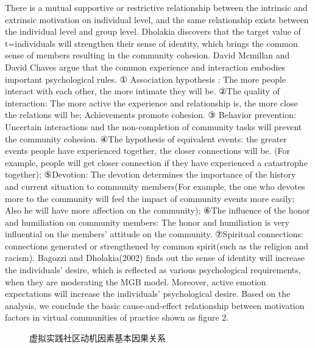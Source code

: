 \documentclass{elsarticle}
\begin{document}
There is a mutual supportive or restrictive relationship between the
intrinsic and extrinsic motivation on individual level, and the same
relationship exists between the individual level and group
level. Dholakia discovers that the target value of t=individuals will
strengthen their sense of identity, which brings the common sense of
members resulting in the community cohesion\cite{dholakia2004241}. David Mcmillan and David
Chaves argue that the common experience and interaction embodies
important psychological rules. ① Association hypothesis : The more
people interact with each other, the more intimate they will be. ②The
quality of interaction: The more active the experience and
relationship is, the more close the relations will be; Achievements
promote cohesion. ③ Behavior prevention: Uncertain interactions and
the non-completion of community tasks will prevent the community
cohesion. ④The hypothesis of equivalent events: the greater events
people have experienced together, the closer connections will be. (For
example, people will get closer connection if they have experienced a
catastrophe together); ⑤Devotion: The devotion determines the
importance of the history and current situation to community
members(For example, the one who devotes more to the community will
feel the impact of community events more easily; Also he will have
more affection on the community); ⑥The influence of the honor and
humiliation on community members: The honor and humiliation is very
influential on the members’ attitude on the community. ⑦Spiritual
connections: connections generated or strengthened by common
spirit(such as the religion and racism)\cite{mcmillan1986scd}. Bagozzi and
Dholakia(2002) finds out the sense of identity will increase the
individuals’ desire, which is reflected as various psychological
requirements, when they are moderating the MGB model. Moreover, active
emotion expectations will increase the individuals’ psychological
desire\cite{richard_p._bagozzi_intentional_2002}. Based on the analysis, we conclude the basic
cause-and-effect relationship between motivation factors in virtual
communities of practice shown as figure 2.
\begin{figure}[htpb]
  \centering
  \label{fig:cause-and-effect}
  \caption{虚拟实践社区动机因素基本因果关系}
\end{figure}
\end{document}
